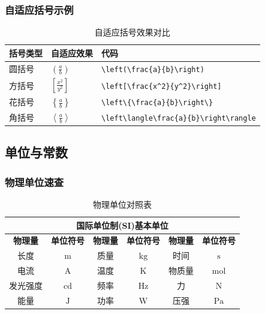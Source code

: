 \documentclass{article}
\begin{document}
\subsubsection{自适应括号示例}
\begin{table}[H]
    \centering
    \renewcommand{\arraystretch}{2.0}
    \begin{tabular}{>{\centering}p{2cm}>{\centering}p{2cm}>{\centering\arraybackslash}p{8cm}}
        \hline
        \textbf{括号类型} & \textbf{自适应效果}                         & \textbf{代码}                                      \\
        \hline
        圆括号           & $\left(\frac{a}{b}\right)$             & \lstinline|\left(\frac{a}{b}\right)|             \\
        \hline
        方括号           & $\left[\frac{x^2}{y^2}\right]$         & \lstinline|\left[\frac{x^2}{y^2}\right]|         \\
        \hline
        花括号           & $\left\{\frac{a}{b}\right\}$           & \lstinline|\left\{\frac{a}{b}\right\}|           \\
        \hline
        角括号           & $\left\langle\frac{a}{b}\right\rangle$ & \lstinline|\left\langle\frac{a}{b}\right\rangle| \\
        \hline
    \end{tabular}
    \caption{自适应括号效果对比}
\end{table}

\subsection{单位与常数}

\subsubsection{物理单位速查}
\begin{table}[H]
    \centering
    \renewcommand{\arraystretch}{1.3}
    \begin{tabular}{||c|c||c|c||c|c||}
        \hline\hline
        \multicolumn{6}{||c||}{\textbf{国际单位制(SI)基本单位}}                                             \\
        \hline\hline
        \textbf{物理量} & \textbf{单位符号} & \textbf{物理量} & \textbf{单位符号} & \textbf{物理量} & \textbf{单位符号} \\
        \hline
        长度           & $\text{m}$    & 质量           & $\text{kg}$   & 时间           & $\text{s}$    \\
        \hline
        电流           & $\text{A}$    & 温度           & $\text{K}$    & 物质量          & $\text{mol}$  \\
        \hline
        发光强度         & $\text{cd}$   & 频率           & $\text{Hz}$   & 力            & $\text{N}$    \\
        \hline
        能量           & $\text{J}$    & 功率           & $\text{W}$    & 压强           & $\text{Pa}$   \\
        \hline\hline
    \end{tabular}
    \caption{物理单位对照表}
\end{table}
\end{document}
